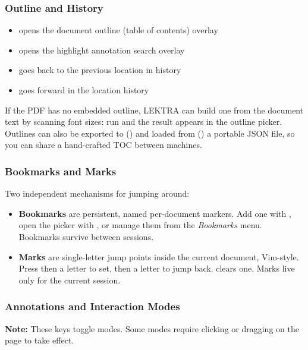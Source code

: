 \documentclass[a4paper,12pt]{article}
\begin{document}
\subsubsection{Outline and History}
\begin{itemize}[leftmargin=*]
    \item {} opens the document outline (table of contents) overlay
    \item {} opens the highlight annotation search overlay
    \item {} goes back to the previous location in history
    \item {} goes forward in the location history
\end{itemize}

If the PDF has no embedded outline, LEKTRA can build one from the document text by scanning font sizes: run  and the result appears in the outline picker. Outlines can also be exported to () and loaded from () a portable JSON file, so you can share a hand-crafted TOC between machines.

\subsubsection{Bookmarks and Marks}

Two independent mechanisms for jumping around:
\begin{itemize}[leftmargin=*]
    \item \textbf{Bookmarks} are persistent, named per-document markers. Add one with , open the picker with , or manage them from the \textit{Bookmarks} menu. Bookmarks survive between sessions.
    \item \textbf{Marks} are single-letter jump points inside the current document, Vim-style. Press  then a letter to set,  then a letter to jump back.  clears one. Marks live only for the current session.
\end{itemize}

\subsubsection{Annotations and Interaction Modes}
\begin{ghnote}
    \textbf{Note:} These keys toggle modes. Some modes require clicking or dragging on the page to take effect.
\end{ghnote}
\end{document}
